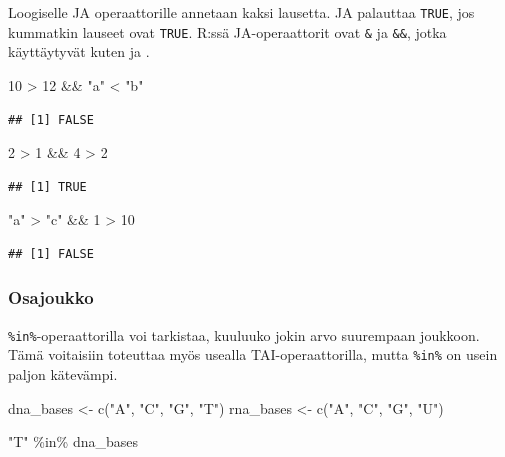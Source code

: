 \documentclass[
]{book}
\newenvironment{Shaded}{\begin{snugshade}}{\end{snugshade}}
\newcommand{\DecValTok}[1]{\textcolor[rgb]{0.00,0.00,0.81}{#1}}
\newcommand{\FunctionTok}[1]{\textcolor[rgb]{0.00,0.00,0.00}{#1}}
\newcommand{\NormalTok}[1]{#1}
\newcommand{\OtherTok}[1]{\textcolor[rgb]{0.56,0.35,0.01}{#1}}
\newcommand{\SpecialCharTok}[1]{\textcolor[rgb]{0.00,0.00,0.00}{#1}}
\newcommand{\StringTok}[1]{\textcolor[rgb]{0.31,0.60,0.02}{#1}}
\begin{document}
Loogiselle JA operaattorille annetaan kaksi lausetta. JA palauttaa \texttt{TRUE}, jos kummatkin lauseet ovat \texttt{TRUE}. R:ssä JA-operaattorit ovat \texttt{\&} ja \texttt{\&\&}, jotka käyttäytyvät kuten \texttt{\textbar{}} ja \texttt{\textbar{}\textbar{}}.

\begin{Shaded}
\begin{Highlighting}[]
\DecValTok{10} \SpecialCharTok{\textgreater{}} \DecValTok{12} \SpecialCharTok{\&\&} \StringTok{"a"} \SpecialCharTok{\textless{}} \StringTok{"b"}
\end{Highlighting}
\end{Shaded}

\begin{verbatim}
## [1] FALSE
\end{verbatim}

\begin{Shaded}
\begin{Highlighting}[]
\DecValTok{2} \SpecialCharTok{\textgreater{}} \DecValTok{1} \SpecialCharTok{\&\&} \DecValTok{4} \SpecialCharTok{\textgreater{}} \DecValTok{2}
\end{Highlighting}
\end{Shaded}

\begin{verbatim}
## [1] TRUE
\end{verbatim}

\begin{Shaded}
\begin{Highlighting}[]
\StringTok{"a"} \SpecialCharTok{\textgreater{}} \StringTok{"c"} \SpecialCharTok{\&\&} \DecValTok{1} \SpecialCharTok{\textgreater{}} \DecValTok{10}
\end{Highlighting}
\end{Shaded}

\begin{verbatim}
## [1] FALSE
\end{verbatim}

\hypertarget{osajoukko}{%
\subsubsection{Osajoukko}\label{osajoukko}}

\texttt{\%in\%}-operaattorilla voi tarkistaa, kuuluuko jokin arvo suurempaan joukkoon. Tämä voitaisiin toteuttaa myös usealla TAI-operaattorilla, mutta \texttt{\%in\%} on usein paljon kätevämpi.

\begin{Shaded}
\begin{Highlighting}[]
\NormalTok{dna\_bases }\OtherTok{\textless{}{-}} \FunctionTok{c}\NormalTok{(}\StringTok{"A"}\NormalTok{, }\StringTok{"C"}\NormalTok{, }\StringTok{"G"}\NormalTok{, }\StringTok{"T"}\NormalTok{)}
\NormalTok{rna\_bases }\OtherTok{\textless{}{-}} \FunctionTok{c}\NormalTok{(}\StringTok{"A"}\NormalTok{, }\StringTok{"C"}\NormalTok{, }\StringTok{"G"}\NormalTok{, }\StringTok{"U"}\NormalTok{)}

\StringTok{"T"} \SpecialCharTok{\%in\%}\NormalTok{ dna\_bases}
\end{Highlighting}
\end{Shaded}
\end{document}
